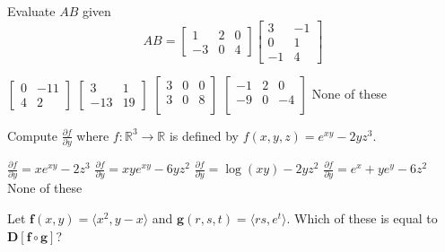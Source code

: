 \documentclass[12pt]{exam}
\newcommand{\vect}[1]{\ensuremath{\mathbf{#1}}}
\newcommand{\<}{\langle}
\renewcommand{\>}{\rangle}
\newcommand{\p}{\partial}
\begin{document}
\begin{questions}

\setcounter{question}{0}
\question[20]
Evaluate \(AB\) given
\[
  AB
    =
  \left[
  \begin{matrix}
     1 &  2 &  0\\
    -3 &  0 &  4
  \end{matrix}
  \right]
  \left[
  \begin{matrix}
     3 & -1 \\
     0 &  1 \\
    -1 &  4
  \end{matrix}
  \right]
\]


\begin{checkboxes}
\choice \(
  \left[
  \begin{matrix}
     0  & -11 \\
     4 & 2
  \end{matrix}
  \right]
\)
\choice \(
  \left[
  \begin{matrix}
     3  &  1 \\
    -13 & 19
  \end{matrix}
  \right]
\)
\choice \(
  \left[
  \begin{matrix}
     3  &  0 & 0 \\
     3 &  0 & 8 \\
  \end{matrix}
  \right]
\)
\choice \(
  \left[
  \begin{matrix}
     -1  &  2 & 0 \\
     -9 &  0 & -4 \\
  \end{matrix}
  \right]
\)
\choice None of these
\end{checkboxes}

\vfill

\question[20]
Compute \(\frac{\p f}{\p y}\) where \(f:\mathbb R^3\to\mathbb R\) is
defined by \(f(x,y,z) = e^{xy}-2yz^3 \).

\begin{checkboxes}
\choice \(\frac{\p f}{\p y}=xe^{xy}-2z^3\)
\choice \(\frac{\p f}{\p y}=xye^{xy}-6yz^2\)
\choice \(\frac{\p f}{\p y}=\log(xy)-2yz^2\)
\choice \(\frac{\p f}{\p y}=e^x + ye^y -6z^2\)
\choice None of these
\end{checkboxes}

\vfill
\newpage

\question[20]
Let \(\vect f(x,y)=\<x^2,y-x\>\) and \(\vect g(r,s,t)=\<rs,e^t\>\).
Which of these is equal to \(\vect D[\vect f\circ\vect g]\)?


\end{questions}
\end{document}
